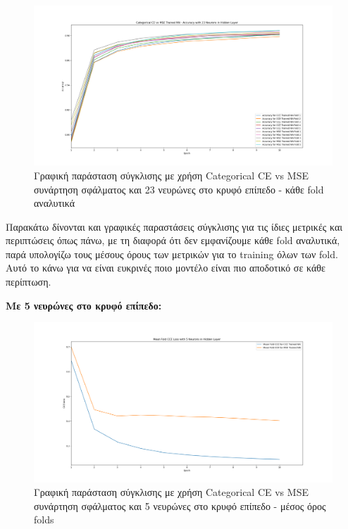 \documentclass[12pt,a4paper]{article}
\begin{document}
\begin{figure}[H]
	\includegraphics[width=\textwidth]{Screenshots/9. CCE vs MSE - Accuracy - 23 Neurons.png}
	\caption{Γραφική παράσταση σύγκλισης με χρήση Categorical CE vs MSE συνάρτηση σφάλματος και 23 νευρώνες στο κρυφό επίπεδο - κάθε fold αναλυτικά}
\end{figure}

Παρακάτω δίνονται και γραφικές παραστάσεις σύγκλισης για τις ίδιες μετρικές και περιπτώσεις όπως πάνω, με τη διαφορά ότι δεν εμφανίζουμε κάθε fold αναλυτικά, παρά υπολογίζω τους μέσους όρους των μετρικών για το training όλων των fold. Αυτό το κάνω για να είναι ευκρινές ποιο μοντέλο είναι πιο αποδοτικό σε κάθε περίπτωση.

\textbf{Με 5 νευρώνες στο κρυφό επίπεδο:}

\begin{figure}[H]
	\includegraphics[width=\textwidth]{Screenshots/10. CCE vs MSE - CCE Loss - 5 Neurons - Mean.png}
	\caption{Γραφική παράσταση σύγκλισης με χρήση Categorical CE vs MSE συνάρτηση σφάλματος και 5 νευρώνες στο κρυφό επίπεδο - μέσος όρος folds}
\end{figure}
\end{document}
